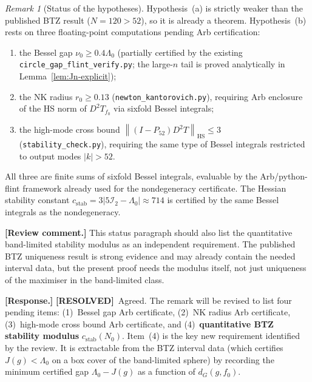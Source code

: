 \documentclass[12pt]{article}
\theoremstyle{definition}
\theoremstyle{remark}
\newtheorem{remark}[theorem]{Remark}
\newcommand{\norm}[1]{\left\|#1\right\|}
\newcommand{\review}[1]{\par\smallskip\noindent\textbf{\color{red}[Review comment.]} {\color{red}#1}\par\smallskip}
\newcommand{\response}[1]{\par\noindent\textbf{\color{blue}[Response.]} {\color{blue}#1}\par\smallskip}
\newcommand{\resolved}{\textbf{\color{teal}[RESOLVED]}}
\begin{document}
\begin{remark}[Status of the hypotheses]
  \label{rem:hyp-status}
  Hypothesis~(a) is strictly weaker than the published BTZ result
  ($N=120>52$), so it is already a theorem.  Hypothesis~(b) rests on
  three floating-point computations pending Arb certification:
  \begin{enumerate}[leftmargin=2em]
    \item the Bessel gap $\nu_0\geq 0.4\Lambda_0$ (partially certified
      by the existing \texttt{circle\_gap\_flint\_verify.py}; the
      large-$n$ tail is proved analytically in
      Lemma~\ref{lem:Jn-explicit});
    \item the NK radius $r_0\geq 0.13$
      (\texttt{newton\_kantorovich.py}), requiring Arb enclosure of
      the HS norm of $D^2T_{f_0}$ via sixfold Bessel integrals;
    \item the high-mode cross bound
      $\norm{(I-P_{52})D^2T}_{\mathrm{HS}}\leq 3$
      (\texttt{stability\_check.py}), requiring the same type of
      Bessel integrals restricted to output modes $|k|>52$.
  \end{enumerate}
  All three are finite sums of sixfold Bessel integrals, evaluable by
  the Arb/python-flint framework already used for the nondegeneracy
  certificate.  The Hessian stability constant $c_{\mathrm{stab}}
  =3|5\mathcal I_2-\Lambda_0|\approx 714$ is certified by the same
  Bessel integrals as the nondegeneracy.
\end{remark}

\review{This status paragraph should also list the quantitative
band-limited stability modulus as an independent requirement.  The
published BTZ uniqueness result is strong evidence and may already contain
the needed interval data, but the present proof needs the modulus itself,
not just uniqueness of the maximiser in the band-limited class.}

\response{\resolved\ Agreed.  The remark will be revised to list four
pending items: (1)~Bessel gap Arb certificate, (2)~NK radius Arb
certificate, (3)~high-mode cross bound Arb certificate, and
(4)~\textbf{quantitative BTZ stability modulus}
$c_{\mathrm{stab}}(N_0)$.  Item~(4) is the key new requirement
identified by the review.  It is extractable from the BTZ interval
data (which certifies $J(g)<\Lambda_0$ on a box cover of the
band-limited sphere) by recording the minimum certified gap
$\Lambda_0-J(g)$ as a function of $d_G(g,f_0)$.}
\end{document}
